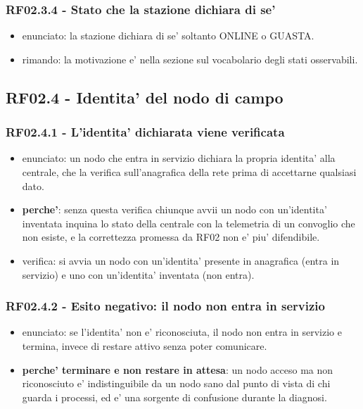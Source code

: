 \documentclass[11pt]{article}
\begin{document}
\subsubsection{RF02.3.4 - Stato che la stazione dichiara di se'}
\label{sec:org219b1fc}
\begin{itemize}
\item enunciato: la stazione dichiara di se' soltanto ONLINE o GUASTA.
\item rimando: la motivazione e' nella sezione sul vocabolario degli stati osservabili.
\end{itemize}
\subsection{RF02.4 - Identita' del nodo di campo}
\label{sec:org28f7b79}
\subsubsection{RF02.4.1 - L'identita' dichiarata viene verificata}
\label{sec:org0356634}
\begin{itemize}
\item enunciato: un nodo che entra in servizio dichiara la propria identita' alla centrale, che la
verifica sull'anagrafica della rete prima di accettarne qualsiasi dato.
\item \textbf{perche'}: senza questa verifica chiunque avvii un nodo con un'identita' inventata inquina lo stato
della centrale con la telemetria di un convoglio che non esiste, e la correttezza promessa da RF02
non e' piu' difendibile.
\item verifica: si avvia un nodo con un'identita' presente in anagrafica (entra in servizio) e uno con
un'identita' inventata (non entra).
\end{itemize}
\subsubsection{RF02.4.2 - Esito negativo: il nodo non entra in servizio}
\label{sec:orgfe15649}
\begin{itemize}
\item enunciato: se l'identita' non e' riconosciuta, il nodo non entra in servizio e termina, invece di
restare attivo senza poter comunicare.
\item \textbf{perche' terminare e non restare in attesa}: un nodo acceso ma non riconosciuto e' indistinguibile
da un nodo sano dal punto di vista di chi guarda i processi, ed e' una sorgente di confusione
durante la diagnosi.
\end{itemize}
\end{document}
